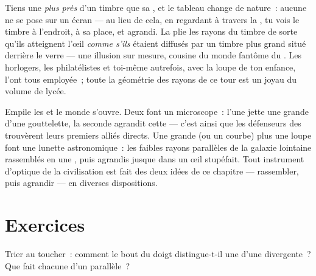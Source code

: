 \begin{example}\label{ex:g8:lenses-images:magnifier}
Tiens une  \emph{plus près} d'un timbre que sa
, et le tableau change de nature~: aucune  ne se
pose sur un écran --- au lieu de cela, en regardant à travers la
, tu vois le timbre à l'endroit, à sa place, et agrandi. La
 plie les rayons du timbre de sorte qu'ils atteignent l'œil
\emph{comme s'ils} étaient diffusés par un timbre plus grand situé
derrière le verre --- une illusion sur mesure, cousine du monde
fantôme du . Les horlogers, les philatélistes et toi-même
autrefois, avec la loupe de ton enfance, l'ont tous employée~; toute
la géométrie des rayons de ce tour est un joyau du volume de lycée.
\end{example}

\begin{remark}\label{rem:g8:lenses-images:instruments}
Empile les  et le monde s'ouvre. Deux 
font un microscope~: l'une jette une grande  d'une
gouttelette, la seconde agrandit cette  --- c'est ainsi que les
défenseurs des  trouvèrent leurs premiers alliés directs.
Une grande  (ou un  courbe) plus une loupe font une
lunette astronomique~: les faibles rayons parallèles de la galaxie
lointaine rassemblés en une , puis agrandis jusque dans un
œil stupéfait. Tout instrument d'optique de la civilisation est fait
des deux idées de ce chapitre --- rassembler, puis agrandir --- en
diverses dispositions.
\end{remark}

\section{Exercices}

\begin{exercise}[$\star$]\label{exo:g8:lenses-images:1}
Trier au toucher~: comment le bout du doigt distingue-t-il une
 d'une divergente~? Que fait chacune d'un 
parallèle~?
\end{exercise}

